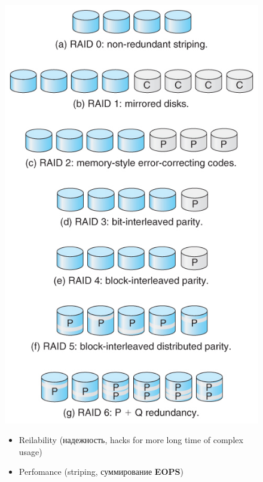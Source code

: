 \documentclass[../../lectures.tex]{subfiles}
\begin{document}
\begin{figure}[H]
\captionsetup{singlelinecheck=off}
\begin{minipage}[c]{0.45\linewidth}
\centering
\includegraphics[width=\textwidth]{images/raid-levels.jpg}
\end{minipage}
\hspace{0.5cm}
\begin{minipage}[c]{0.55\linewidth}
\centering
\begin{itemize}
    \item Reilability (надежность, hacks for more long time of complex usage)
    \item Perfomance (striping, суммирование \textbf{EOPS})

\end{itemize}
\end{minipage}
\end{figure}
\end{document}
